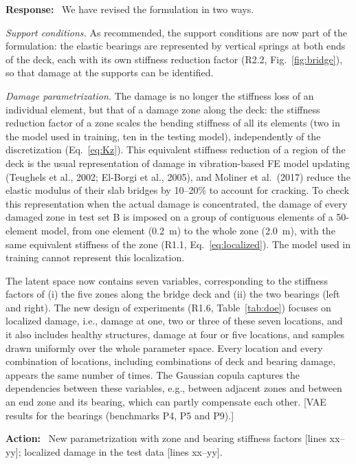 \documentclass[11pt]{article}
\newenvironment{response}{\par\smallskip\noindent\color{resp}\textbf{Response:}\ }{\par}
\newenvironment{action}{\par\smallskip\noindent\color{resp}\textbf{Action:}\ }{\par}
\newcommand{\tbd}[1]{\textcolor{note}{\textsf{[#1]}}}
\newcommand{\lines}[1]{\tbd{lines #1}}
\begin{document}
\begin{response}
We have revised the formulation in two ways.

\textit{Support conditions.} As recommended, the support conditions are now part of the formulation: the elastic bearings
are represented by vertical springs at both ends of the deck, each with its own stiffness reduction factor (R2.2,
Fig.~\ref{fig:bridge}), so that damage at the supports can be identified.

\textit{Damage parametrization.} The damage is no longer the stiffness loss of an individual element, but that of a damage
zone along the deck: the stiffness reduction factor of a zone scales the bending stiffness of all its elements (two in the
model used in training, ten in the testing model), independently of the discretization (Eq.~\eqref{eq:Kz}). This
equivalent stiffness reduction of a region of the deck is the usual representation of damage in vibration-based FE model
updating (Teughels et al., 2002; El-Borgi et al., 2005), and Moliner et al.\ (2017) reduce the elastic modulus of their
slab bridges by 10--20\% to account for cracking. To check this representation when the actual damage is concentrated,
the damage of every damaged zone in test set B is imposed on a group of contiguous elements of a 50-element model, from one
element (0.2~m) to the whole zone (2.0~m), with the same equivalent stiffness of the zone (R1.1, Eq.~\eqref{eq:localized}).
The model used in training cannot represent this localization.

The latent space now contains seven variables, corresponding to the stiffness factors of (i) the five zones along the
bridge deck and (ii) the two bearings (left and right). The new design of experiments (R1.6, Table~\ref{tab:doe}) focuses
on localized damage, i.e., damage at one, two or three of these seven locations, and it also includes healthy structures,
damage at four or five locations, and samples drawn uniformly over the whole parameter space. Every location and every
combination of locations, including combinations of deck and bearing damage, appears the same number of times. The
Gaussian copula captures the dependencies between these variables, e.g., between adjacent zones and between an end zone
and its bearing, which can partly compensate each other.
\tbd{VAE results for the bearings (benchmarks P4, P5 and P9).}
\end{response}

\begin{action}
New parametrization with zone and bearing stiffness factors \lines{xx--yy}; localized damage in the test data
\lines{xx--yy}.
\end{action}
\end{document}
